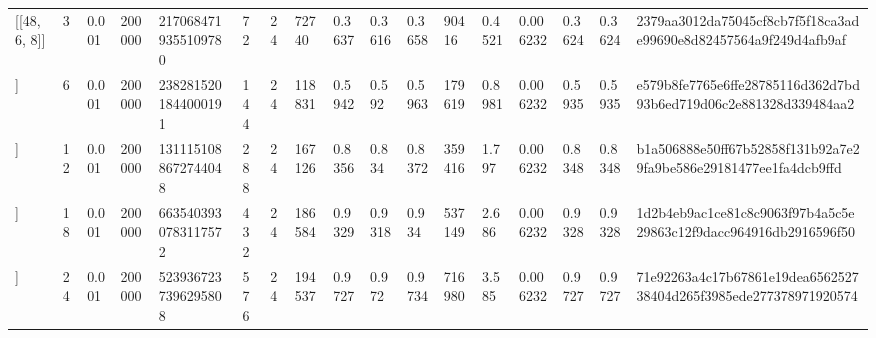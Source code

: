 \begin{tabular}{lllllllllllllllll}
[[48, 6, 8]] & 3 & 0.001 & 200000 & 2170684719355109780 & 72 & 24 & 72740 & 0.3637 & 0.3616 & 0.3658 & 90416 & 0.4521 & 0.006232 & 0.3624 & 0.3624 & 2379aa3012da75045cf8cb7f5f18ca3ade99690e8d82457564a9f249d4afb9af \\
[[48, 6, 8]] & 6 & 0.001 & 200000 & 2382815201844000191 & 144 & 24 & 118831 & 0.5942 & 0.592 & 0.5963 & 179619 & 0.8981 & 0.006232 & 0.5935 & 0.5935 & e579b8fe7765e6ffe28785116d362d7bd93b6ed719d06c2e881328d339484aa2 \\
[[48, 6, 8]] & 12 & 0.001 & 200000 & 1311151088672744048 & 288 & 24 & 167126 & 0.8356 & 0.834 & 0.8372 & 359416 & 1.797 & 0.006232 & 0.8348 & 0.8348 & b1a506888e50ff67b52858f131b92a7e29fa9be586e29181477ee1fa4dcb9ffd \\
[[48, 6, 8]] & 18 & 0.001 & 200000 & 6635403930783117572 & 432 & 24 & 186584 & 0.9329 & 0.9318 & 0.934 & 537149 & 2.686 & 0.006232 & 0.9328 & 0.9328 & 1d2b4eb9ac1ce81c8c9063f97b4a5c5e29863c12f9dacc964916db2916596f50 \\
[[48, 6, 8]] & 24 & 0.001 & 200000 & 5239367237396295808 & 576 & 24 & 194537 & 0.9727 & 0.972 & 0.9734 & 716980 & 3.585 & 0.006232 & 0.9727 & 0.9727 & 71e92263a4c17b67861e19dea656252738404d265f3985ede277378971920574 \\
\hline
\end{tabular}
